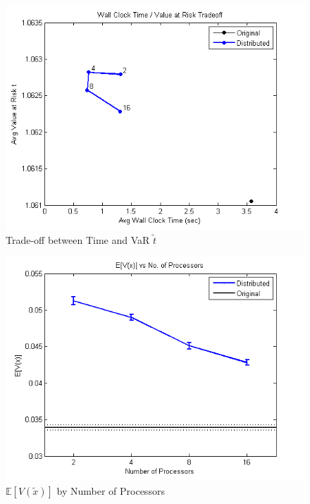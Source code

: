 \documentclass[12pt]{article}
\begin{document}
\begin{figure}[ht]
	\centering
		\includegraphics{../plot/figs/wct_objfnval_frontier.png}
	\caption{Trade-off between Time and VaR $\tilde{t}$}
	\label{fig:wct_objfnval_frontier}
\end{figure}

\begin{figure}[ht]
	\centering
		\includegraphics{../plot/figs/expviolprob_numproc.png}
	\caption{$\mathbb{E}[V(\tilde{x})]$ by Number of Processors}
	\label{fig:expviolprob_numproc}
\end{figure}
\end{document}
